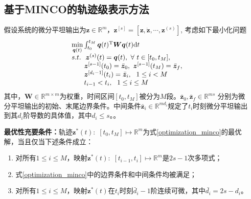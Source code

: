 \subsection{基于MINCO的轨迹级表示方法}
假设系统的微分平坦输出为$\boldsymbol{z} \in \mathbb{R}^m$，$\boldsymbol{z}^{[s]} = [\boldsymbol{z}, \dot{\boldsymbol{z}}, \cdots, \boldsymbol{z}^{(s)}]$, 考虑如下最小化问题
\begin{equation}\label{optimization_minco}
    \begin{array}{l}
        \mathop {\min }\limits_{\boldsymbol{q}(t)} \int_{{t_0}}^{{t_M}} \boldsymbol{q}(t){\rm{^T}}\boldsymbol{W}\boldsymbol{q}(t){\rm{d}}t\\
        s.t. \,\,\,\, \boldsymbol{z}^{(s)}(t) = \boldsymbol{q}(t),\,\, \forall \,\, t \in [t_0, t_M], \\
        \,\,\,\,\,\,\,\,\,\,\, \boldsymbol{z}^{[s-1]}(t_0) = \bar{\boldsymbol{z}}_0, \,\, \boldsymbol{z}^{[s-1]}(t_M) = \bar{\boldsymbol{z}}_f,\\
        \,\,\,\,\,\,\,\,\,\,\, \boldsymbol{z}^{[d_i-1]}(t_i) = \bar{\boldsymbol{z}}_i, \,\,\,\, 1 \le i  < M\\
        \,\,\,\,\,\,\,\,\,\,\,  t_{i-1} < t_i, \,\,\,\, 1 \le i \le M
    \end{array}
\end{equation}
其中，$\boldsymbol{W}\in \mathbb{R}^{m\times m}$为权重，时间区间$[t_0, t_M]$被分为$M$段。$\bar{\boldsymbol{z}}_0, \bar{\boldsymbol{z}}_f \in \mathbb{R}^{ms}$ 分别为微分平坦输出的初始、末尾边界条件。中间条件$\bar{\boldsymbol{z}}_i \in \mathbb{R}^{md_i}$规定了$t_i$时刻微分平坦输出到其$d_i$阶导数的具体值，其中$d_i \le s$。。

\textbf{最优性充要条件：}轨迹$\boldsymbol{z}^*(t):\,\,[t_0,t_M] \mapsto \mathbb{R}^m$为式\ref{optimization_minco}的最优解，当且仅当下述条件成立：
\begin{enumerate}
    \item 对所有$1 \le i \le M$，映射$\boldsymbol{z}^*(t):\,\,[t_{i-1},t_i] \mapsto \mathbb{R}^m$是$2s-1$次多项式；
    \item 式\ref{optimization_minco}中的边界条件和中间条件均被满足；
    \item 对所有$1 \le i \le M$，映射$\boldsymbol{z}^*(t)$在$t_i$时刻$\bar{d}_i-1$阶连续可微，其中$\bar{d_i} = 2s-d_i$。
\end{enumerate}

